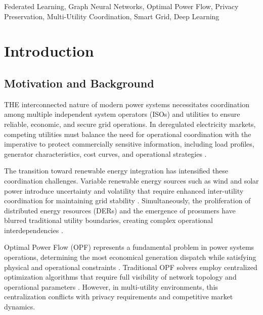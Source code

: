 \documentclass[journal,10pt]{IEEEtran}
\begin{document}
\begin{IEEEkeywords}
Federated Learning, Graph Neural Networks, Optimal Power Flow, Privacy Preservation, Multi-Utility Coordination, Smart Grid, Deep Learning
\end{IEEEkeywords}

\section{Introduction}

\subsection{Motivation and Background}

THE interconnected nature of modern power systems necessitates coordination among multiple independent system operators (ISOs) and utilities to ensure reliable, economic, and secure grid operations. In deregulated electricity markets, competing utilities must balance the need for operational coordination with the imperative to protect commercially sensitive information, including load profiles, generator characteristics, cost curves, and operational strategies \cite{schweppe1988spot, wood2013power}.

The transition toward renewable energy integration has intensified these coordination challenges. Variable renewable energy sources such as wind and solar power introduce uncertainty and volatility that require enhanced inter-utility coordination for maintaining grid stability \cite{chen2023renewable}. Simultaneously, the proliferation of distributed energy resources (DERs) and the emergence of prosumers have blurred traditional utility boundaries, creating complex operational interdependencies \cite{pinson2023distributed}.

Optimal Power Flow (OPF) represents a fundamental problem in power systems operations, determining the most economical generation dispatch while satisfying physical and operational constraints \cite{carpentier1962contribution}. Traditional OPF solvers employ centralized optimization algorithms that require full visibility of network topology and operational parameters \cite{zimmerman2011matpower}. However, in multi-utility environments, this centralization conflicts with privacy requirements and competitive market dynamics.
\end{document}
